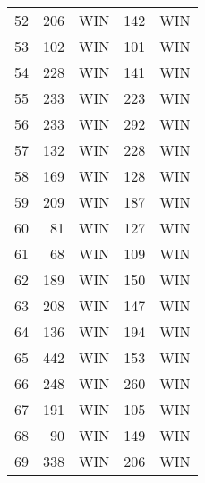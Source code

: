 \begin{tabular}{rrrrr}
        52 &        206 &        WIN &        142 &        WIN \\

        53 &        102 &        WIN &        101 &        WIN \\

        54 &        228 &        WIN &        141 &        WIN \\

        55 &        233 &        WIN &        223 &        WIN \\

        56 &        233 &        WIN &        292 &        WIN \\

        57 &        132 &        WIN &        228 &        WIN \\

        58 &        169 &        WIN &        128 &        WIN \\

        59 &        209 &        WIN &        187 &        WIN \\

        60 &         81 &        WIN &        127 &        WIN \\

        61 &         68 &        WIN &        109 &        WIN \\

        62 &        189 &        WIN &        150 &        WIN \\

        63 &        208 &        WIN &        147 &        WIN \\

        64 &        136 &        WIN &        194 &        WIN \\

        65 &        442 &        WIN &        153 &        WIN \\

        66 &        248 &        WIN &        260 &        WIN \\

        67 &        191 &        WIN &        105 &        WIN \\

        68 &         90 &        WIN &        149 &        WIN \\

        69 &        338 &        WIN &        206 &        WIN \\


\end{tabular}

